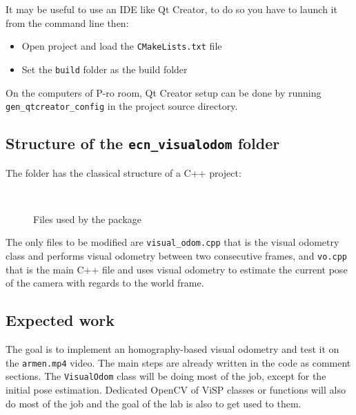 \documentclass{ecnreport}
\begin{document}
It may be useful to use an IDE like Qt Creator, to do so you have to launch it from the command line then:
\begin{itemize}
 \item Open project and load the \texttt{CMakeLists.txt} file
 \item Set the \texttt{build} folder as the build folder
\end{itemize}
On the computers of P-ro room, Qt Creator setup can be done by running \texttt{gen\_qtcreator\_config} in the project source directory.
 

\subsection{Structure of the \texttt{ecn\_visualodom} folder}

The folder has the classical structure of a C++ project:
\begin{figure}[h]\centering
\begin{minipage}{.05\linewidth} ~ \end{minipage}
\begin{minipage}{.75\linewidth}
\end{minipage}
\caption{Files used by the package}
\end{figure}

The only files to be modified are \texttt{visual\_odom.cpp} that is the visual odometry class and performs visual odometry between two consecutive frames, and \texttt{vo.cpp} that is the main 
C++ file and uses visual odometry to estimate the current pose of the camera with regards to the world frame.


\subsection{Expected work}

The goal is to implement an homography-based visual odometry and test it on the \texttt{armen.mp4} video.
The main steps are already written in the code as comment sections. The \texttt{VisualOdom} class will be doing most of the job, except for the initial pose estimation. 
Dedicated OpenCV of ViSP classes or functions will also do most of the job and the goal of the lab is also to get used to them.
\end{document}

